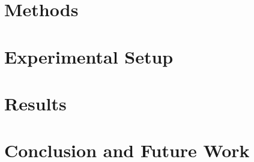 \documentclass{article}
\begin{document}
\section{Methods}\label{sec:proposed_methods}


\section{Experimental Setup}\label{sec:experiments}


\section{Results}\label{sec:results}


\section{Conclusion and Future Work}\label{sec:conclusion}



\end{document}

